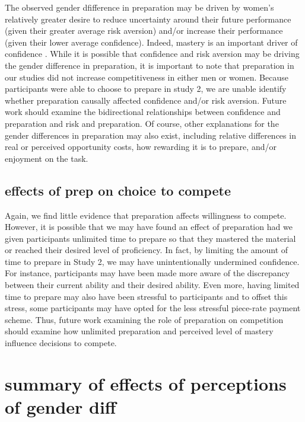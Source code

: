 \documentclass[a4paper, nobind]{templates/ociamthesis}
\begin{document}
The observed gender dfifference in preparation may be driven by women's relatively greater desire to reduce uncertainty around their future performance (given their greater average risk aversion) and/or increase their performance (given their lower average confidence). Indeed, mastery is an important driver of confidence \autocites[for review, see][]{Gist1992,Usher2008}. While it is possible that confidence and risk aversion may be driving the gender difference in preparation, it is important to note that preparation in our studies did not increase competitiveness in either men or women. Because participants were able to choose to prepare in study 2, we are unable identify whether preparation causally affected confidence and/or risk aversion. Future work should examine the bidirectional relationships between confidence and preparation and risk and preparation. Of course, other explanations for the gender differences in preparation may also exist, including relative differences in real or perceived opportunity costs, how rewarding it is to prepare, and/or enjoyment on the task.

\hypertarget{effects-of-prep-on-choice-to-compete}{%
\subsection{effects of prep on choice to compete}\label{effects-of-prep-on-choice-to-compete}}

Again, we find little evidence that preparation affects willingness to compete. However, it is possible that we may have found an effect of preparation had we given participants unlimited time to prepare so that they mastered the material or reached their desired level of proficiency. In fact, by limiting the amount of time to prepare in Study 2, we may have unintentionally undermined confidence. For instance, participants may have been made more aware of the discrepancy between their current ability and their desired ability. Even more, having limited time to prepare may also have been stressful to participants and to offset this stress, some participants may have opted for the less stressful piece-rate payment scheme. Thus, future work examining the role of preparation on competition should examine how unlimited preparation and perceived level of mastery influence decisions to compete.

\hypertarget{summary-of-effects-of-perceptions-of-gender-diff}{%
\section{summary of effects of perceptions of gender diff}\label{summary-of-effects-of-perceptions-of-gender-diff}}
\end{document}
